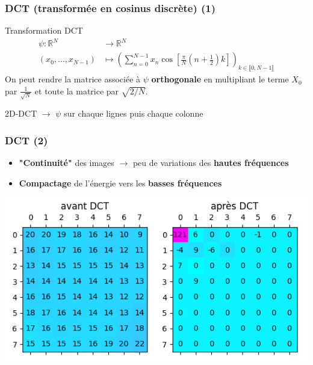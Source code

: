 \documentclass[aspectratio=43]{beamer}
\begin{document}
\begin{frame}
    \frametitle{DCT (transformée en cosinus discrète) (1)}
    \centering
    \begin{block}{Transformation DCT}
        \begin{align*}
            \psi \colon \mathbb{R}^N & \rightarrow \mathbb{R}^N\\
            (x_0, \dots, x_{N-1}) & \longmapsto
            \left( \sum_{n=0}^{N - 1} x_n \cos \left[ \frac{\pi}{N}(n + \frac{1}{2})k \right] \right)_{k \in \llbracket 0, N - 1 \rrbracket}
        \end{align*}
        On peut rendre la matrice associée à $\psi$ \textbf{orthogonale} en multipliant le terme $X_0$ par $\frac{1}{\sqrt{N}}$ et toute la matrice par $\sqrt{2/N}$.
    \end{block}
    2D-DCT $\rightarrow$ $\psi$ sur chaque lignes puis chaque colonne
\end{frame}

\begin{frame}
    \frametitle{DCT (2)}

    \begin{itemize}
        \item \textbf{"Continuité"} des images $\rightarrow$ peu de variations des \textbf{hautes fréquences}
        \item \textbf{Compactage} de l'énergie vers les \textbf{basses fréquences}
    \end{itemize}

    \centering
    \includegraphics[width=\textwidth]{img/energyCompaction.png}

\end{frame}
\end{document}
